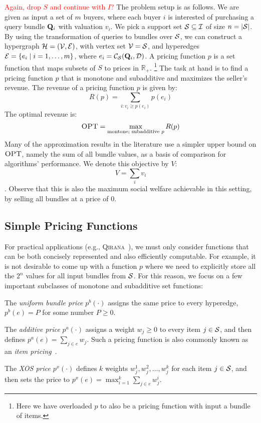 \textcolor{red}{Again, drop $S$ and continue with $I$?}
The problem setup is as follows. We are given as input a set of $m$ buyers, where each buyer $i$ is interested of purchasing a query bundle $\mathbf{Q}_i$ with valuation $v_i$. We pick a support set $\mathcal{S} \subseteq \mathcal{I}$ of size $n = |\mathcal{S}|$. By using the transformation of queries to bundles over $\mathcal{S}$, we can construct a hypergraph $\mathcal{H} = (\mathcal{V},\mathcal{E})$, with vertex set $\mathcal{V} = \mathcal{S}$, and hyperedges $\mathcal{E} = \{{e_i}\mid{i =1, \dots, m}\}$, where $e_i ={\mathcal{C}}_{\mathcal{S}}(\mathbf{Q}_i, \mathcal{D})$. A pricing function $p$ is a set function that maps subsets of $S$ to prices in $\mathbb{R}_+$. \footnote{Here we have overloaded $p$ to also be a pricing function with input a bundle of items.} The task at hand is to find a pricing function $p$ that is monotone and subadditive and maximizes the seller's revenue. The revenue of a pricing function $p$ is given by:
\[R(p) = \sum_{i: v_i\ge p(e_i)} p(e_i)\]
The optimal revenue is:
\[\textsc{OPT} = \max_{\text{montone; subadditive } p} R(p)\]
Many of the approximation results in the literature use a simpler upper bound on $\textsc{OPT}$, namely the sum of all bundle values, as a basis of comparison for algorithms' performance. We denote this objective by $V$: \[V = \sum_i v_i\]. Observe that this is also the maximum social welfare achievable in this setting, by selling all bundles at a price of $0$.

\subsection{Simple Pricing Functions}

For practical applications (e.g., \textsc{Qirana}~\cite{deep2017qirana}), we must only consider functions that can be both concisely represented and also efficiently computable. For example, it is not desirable to come up with a function $p$ where we need to explicitly store all the $2^n$ values for all input bundles from $\mathcal{S}$.
For this reason, we focus on a few important subclasses of monotone and subadditive set functions:
%
\begin{packed_item}
\item The {\em uniform bundle price}  $p^b(\cdot)$ assigns the same price to every hyperedge, \ie $p^b(e) = P$ for some number $P \geq 0$.
%
\item The {\em additive price} $p^a(\cdot)$ assigns a weight $w_j \geq 0$ to every item $j \in \mathcal{S}$, and then defines
$p^a(e) = \sum_{j \in e} w_j$. Such a pricing function is also commonly known as an {\em item pricing}~\cite{}.
%
\item The {\em XOS price} $p^x(\cdot)$ defines $k$ weights $w_j^1, w_j^2, \dots, w_j^k$ for each item $j \in \mathcal{S}$, and then sets the price to $p^x(e) = \max_{i=1}^k \sum_{j \in e} w_j^i$.
\end{packed_item}

